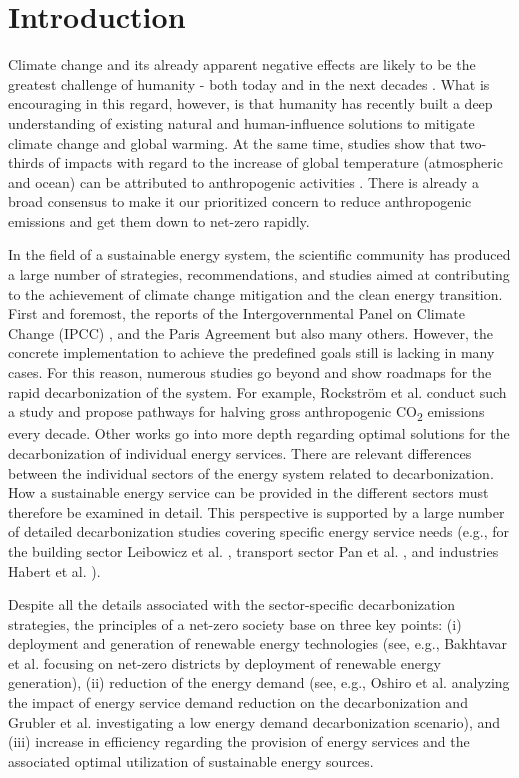 \section{Introduction}
Climate change and its already apparent negative effects are likely to be the greatest challenge of humanity - both today and in the next decades \cite{karl2003modern}. What is encouraging in this regard, however, is that humanity has recently built a deep understanding of existing natural \cite{griscom2017natural} and human-influence solutions to mitigate climate change and global warming. At the same time, studies show that two-thirds of impacts with regard to the increase of global temperature (atmospheric and ocean) can be attributed to anthropogenic activities \cite{hansen2016assessing}. There is already a broad consensus to make it our prioritized concern to reduce anthropogenic emissions and get them down to net-zero rapidly.\newline

In the field of a sustainable energy system, the scientific community has produced a large number of strategies, recommendations, and studies aimed at contributing to the achievement of climate change mitigation and the clean energy transition. First and foremost, the reports of the Intergovernmental Panel on Climate Change (IPCC) \cite{edenhofer2011ipcc}, and the Paris Agreement \cite{agreement2015paris} but also many others. However, the concrete implementation to achieve the predefined goals still is lacking in many cases. For this reason, numerous studies go beyond and show roadmaps for the rapid decarbonization of the system. For example, Rockstr{\"o}m et al. \cite{rockstrom2017roadmap} conduct such a study and propose pathways for halving gross anthropogenic CO\textsubscript{2} emissions every decade. Other works go into more depth regarding optimal solutions for the decarbonization of individual energy services. There are relevant differences between the individual sectors of the energy system related to decarbonization. How a sustainable energy service can be provided in the different sectors must therefore be examined in detail. This perspective is supported by a large number of detailed decarbonization studies covering specific energy service needs (e.g., for the building sector Leibowicz et al. \cite{leibowicz2018optimal}, transport sector Pan et al. \cite{pan2018decarbonization}, and industries Habert et al. \cite{habert2020environmental}).\newline

Despite all the details associated with the sector-specific decarbonization strategies, the principles of a net-zero society base on three key points: (i) deployment and generation of renewable energy technologies (see, e.g., Bakhtavar et al. \cite{bakhtavar2020assessment} focusing on net-zero districts by deployment of renewable energy generation), (ii) reduction of the energy demand (see, e.g., Oshiro et al. \cite{oshiro2021enabling} analyzing the impact of energy service demand reduction on the decarbonization and Grubler et al. \cite{grubler2018low} investigating a low energy demand decarbonization scenario), and (iii) increase in efficiency regarding the provision of energy services and the associated optimal utilization of sustainable energy sources. 

